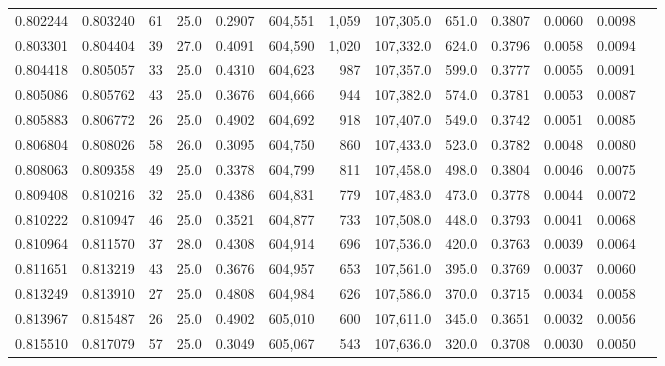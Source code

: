 \begin{tabular}{rrrrrrrrrrrrr}
0.802244 & 0.803240 &    61 & 25.0 &                                     0.2907 & 604,551 &   1,059 & 107,305.0 &     651.0 & 0.3807 & 0.0060 & 0.0098 \\
0.803301 & 0.804404 &    39 & 27.0 &                                     0.4091 & 604,590 &   1,020 & 107,332.0 &     624.0 & 0.3796 & 0.0058 & 0.0094 \\
0.804418 & 0.805057 &    33 & 25.0 &                                     0.4310 & 604,623 &     987 & 107,357.0 &     599.0 & 0.3777 & 0.0055 & 0.0091 \\
0.805086 & 0.805762 &    43 & 25.0 &                                     0.3676 & 604,666 &     944 & 107,382.0 &     574.0 & 0.3781 & 0.0053 & 0.0087 \\
0.805883 & 0.806772 &    26 & 25.0 &                                     0.4902 & 604,692 &     918 & 107,407.0 &     549.0 & 0.3742 & 0.0051 & 0.0085 \\
0.806804 & 0.808026 &    58 & 26.0 &                                     0.3095 & 604,750 &     860 & 107,433.0 &     523.0 & 0.3782 & 0.0048 & 0.0080 \\
0.808063 & 0.809358 &    49 & 25.0 &                                     0.3378 & 604,799 &     811 & 107,458.0 &     498.0 & 0.3804 & 0.0046 & 0.0075 \\
0.809408 & 0.810216 &    32 & 25.0 &                                     0.4386 & 604,831 &     779 & 107,483.0 &     473.0 & 0.3778 & 0.0044 & 0.0072 \\
0.810222 & 0.810947 &    46 & 25.0 &                                     0.3521 & 604,877 &     733 & 107,508.0 &     448.0 & 0.3793 & 0.0041 & 0.0068 \\
0.810964 & 0.811570 &    37 & 28.0 &                                     0.4308 & 604,914 &     696 & 107,536.0 &     420.0 & 0.3763 & 0.0039 & 0.0064 \\
0.811651 & 0.813219 &    43 & 25.0 &                                     0.3676 & 604,957 &     653 & 107,561.0 &     395.0 & 0.3769 & 0.0037 & 0.0060 \\
0.813249 & 0.813910 &    27 & 25.0 &                                     0.4808 & 604,984 &     626 & 107,586.0 &     370.0 & 0.3715 & 0.0034 & 0.0058 \\
0.813967 & 0.815487 &    26 & 25.0 &                                     0.4902 & 605,010 &     600 & 107,611.0 &     345.0 & 0.3651 & 0.0032 & 0.0056 \\
0.815510 & 0.817079 &    57 & 25.0 &                                     0.3049 & 605,067 &     543 & 107,636.0 &     320.0 & 0.3708 & 0.0030 & 0.0050 \\

\end{tabular}
